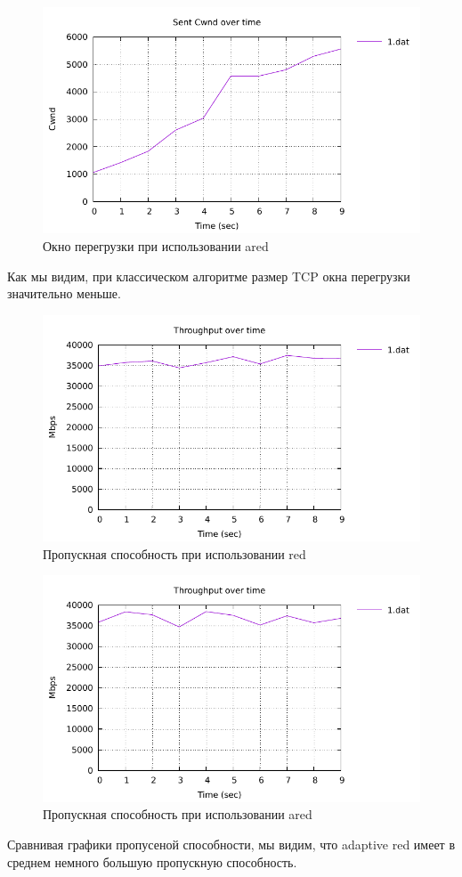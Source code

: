 \begin{figure}[!ht]
  \centering
  \includegraphics[width=0.6\linewidth]{image/ared/cwnd_ared.pdf}
  \caption{Окно перегрузки при использовании ared}
  \label{fig:3.3}
\end{figure}

Как мы видим, при классическом алгоритме размер TCP окна перегрузки значительно меньше. 


\begin{figure}[!ht]
  \centering
  \includegraphics[width=0.6\linewidth]{image/red/throughput_red.pdf}
  \caption{Пропускная способность при использовании red}
  \label{fig:3.4}
\end{figure}

\begin{figure}[!ht]
  \centering
  \includegraphics[width=0.6\linewidth]{image/ared/throughput_ared.pdf}
  \caption{Пропускная способность при использовании ared}
  \label{fig:3.5}
\end{figure}

Сравнивая графики пропусеной способности, мы видим, что  adaptive red имеет в среднем немного большую пропускную способность. 

